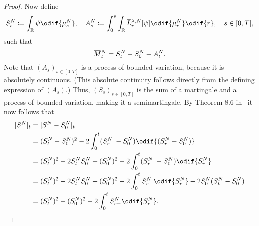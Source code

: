 \begin{proof}
  Now define
  \begin{equation}
    S_s^N \coloneqq \int_\potspace \psi \odif{\mu_s^N},
    \quad
    A_s^N \coloneqq \int_0^s \int_\potspace \ol{L}_r^{\lambda, N} [\psi] \odif{\mu_{r}^N} \odif{r}, \quad s \in [0,T],
  \end{equation}
  such that
  \begin{equation}\label{eq:M=S-A}
    \ol{M}_t^N = S_t^N - S_0^N - A_t^N.
  \end{equation}
  Note that \((A_s)_{s\in[0,T]}\) is a process of bounded variation, because it is absolutely continuous. %
  (This absolute continuity follows directly from the defining expression of \((A_s)\).) %
  Thus, \((S_s)_{s\in[0,T]}\) is the sum of a martingale and a process of bounded variation, making it a semimartingale.
  By Theorem 8.6 in~\cite[221]{klebanerIntroductionStochasticCalculus2012} it now follows that
  \begin{equation}\label{eq:S^2-q-var-rel}
    \begin{split}
      \sbr{S^N}_t & = \sbr{S^N - S_0^N}_t                                                                                \\   %
                  & = (S_t^N - S_0^N)^2 - 2 \int_0^t (S_{r-}^N - S_0^N) \odif{\br{S_r^N - S_0^N}}                        \\
                  & = (S_t^N)^2 - 2 S_t^N S_0^N + (S_0^N)^2 - 2 \int_0^t (S_{r-}^N - S_0^N) \odif{S_r^N}                 \\   %
                  & = (S_t^N)^2 - 2 S_t^N S_0^N + (S_0^N)^2 - 2 \int_0^t S_{r-}^N \odif{S_r^N} + 2 S_0^N (S_t^N - S_0^N) \\
                  & = (S_t^N)^2 - (S_0^N)^2 - 2 \int_0^t S_{r-}^N \odif{S_r^N}.
    \end{split}
  \end{equation}


\end{proof}
